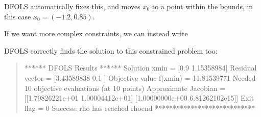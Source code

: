 \documentclass[letterpaper,10pt,english]{sphinxmanual}
\begin{document}
DFO\sphinxhyphen{}LS automatically fixes this, and moves \(x_0\) to a point within the bounds, in this case \(x_0=(-1.2,0.85)\).

If we want more complex constraints, we can instead write
\begin{quote}

\begin{sphinxVerbatim}[commandchars=\\\{\}]
 
      \PYG{p}{[}\PYG{p}{]} 
       
       \PYG{p}{[}\PYG{p}{]}

 
      \PYG{p}{[} \PYG{p}{]} 
      \PYG{p}{[} \PYG{p}{]} 
      

    \PYG{p}{[}\PYG{p}{]}
\end{sphinxVerbatim}
\end{quote}

DFO\sphinxhyphen{}LS correctly finds the solution to this constrained problem too:
\begin{quote}

\begin{sphinxVerbatim}[commandchars=\\\{\}]
****** DFO\PYGZhy{}LS Results ******
Solution xmin = [0.9        1.15358984]
Residual vector = [3.43589838 0.1       ]
Objective value f(xmin) = 11.81539771
Needed 10 objective evaluations (at 10 points)
Approximate Jacobian = [[\PYGZhy{}1.79826221e+01  1.00004412e+01]
 [\PYGZhy{}1.00000000e+00  6.81262102e\PYGZhy{}15]]
Exit flag = 0
Success: rho has reached rhoend
****************************
\end{sphinxVerbatim}
\end{quote}
\end{document}
